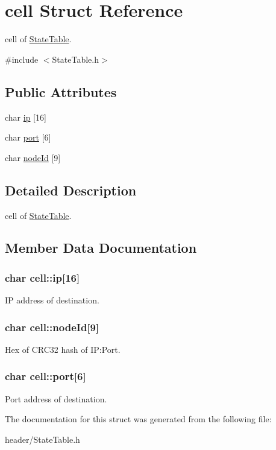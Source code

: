 \hypertarget{structcell}{\section{cell Struct Reference}
\label{structcell}
}


cell of \hyperlink{structStateTable}{State\-Table}.  




{\ttfamily \#include $<$State\-Table.\-h$>$}

\subsection*{Public Attributes}
\begin{DoxyCompactItemize}
\item 
char \hyperlink{structcell_aee8a197a872d7415cabe20bcf5d6a9f2}{ip} \mbox{[}16\mbox{]}
\item 
char \hyperlink{structcell_a3a22d0ea31cf0c84849428e4c635abea}{port} \mbox{[}6\mbox{]}
\item 
char \hyperlink{structcell_a83f12b0f4e5df4800a2b4c18c27041da}{node\-Id} \mbox{[}9\mbox{]}
\end{DoxyCompactItemize}


\subsection{Detailed Description}
cell of \hyperlink{structStateTable}{State\-Table}. 

\subsection{Member Data Documentation}
\hypertarget{structcell_aee8a197a872d7415cabe20bcf5d6a9f2}{
\subsubsection[{ip}]{\setlength{\rightskip}{0pt plus 5cm}char cell\-::ip\mbox{[}16\mbox{]}}}\label{structcell_aee8a197a872d7415cabe20bcf5d6a9f2}
I\-P address of destination. \hypertarget{structcell_a83f12b0f4e5df4800a2b4c18c27041da}{
\subsubsection[{node\-Id}]{\setlength{\rightskip}{0pt plus 5cm}char cell\-::node\-Id\mbox{[}9\mbox{]}}}\label{structcell_a83f12b0f4e5df4800a2b4c18c27041da}
Hex of C\-R\-C32 hash of I\-P\-:Port. \hypertarget{structcell_a3a22d0ea31cf0c84849428e4c635abea}{
\subsubsection[{port}]{\setlength{\rightskip}{0pt plus 5cm}char cell\-::port\mbox{[}6\mbox{]}}}\label{structcell_a3a22d0ea31cf0c84849428e4c635abea}
Port address of destination. 

The documentation for this struct was generated from the following file\-:\begin{DoxyCompactItemize}
\item 
header/State\-Table.\-h\end{DoxyCompactItemize}

